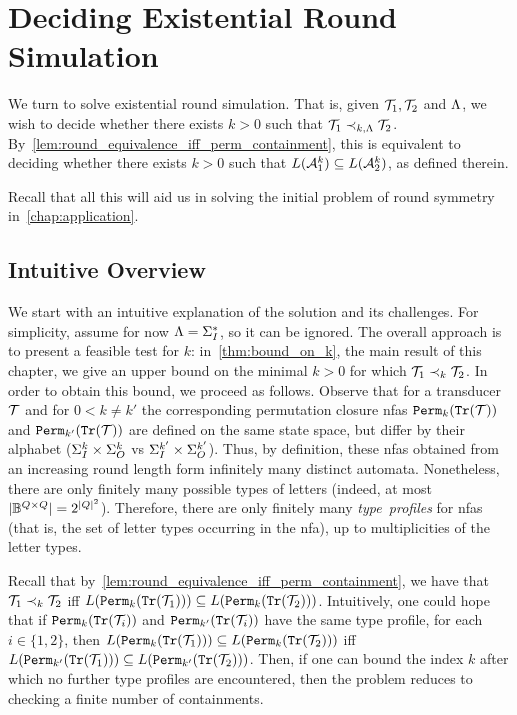 \chapter{Deciding Existential Round Simulation}
\label{chap:deciding_existential_round_sim}

We turn to solve existential round simulation. That is, given $\mathcal{T}_1,\mathcal{T}_2$ and $\Lambda$, we wish to decide whether there exists $k>0$ such that $\mathcal{T}_1\prec_{k,\Lambda} \mathcal{T}_2$. 
By~\cref{lem:round_equivalence_iff_perm_containment}, this is equivalent to deciding whether there exists $k>0$ such that $L(\mathcal{A}^k_1)\subseteq L(\mathcal{A}^k_2)$, as defined therein.

Recall that all this will aid us in solving the initial problem of round symmetry in~\cref{chap:application}.

\section{Intuitive Overview}
\label{sec:intuitive_overview}
We start with an intuitive explanation of the solution and its challenges. For simplicity, assume for now $\Lambda=\Sigma_{I}^*$, so it can be ignored. The overall approach is to present a feasible test for $k$: in~\cref{thm:bound_on_k}, the main result of this chapter, we give an upper bound on the minimal $k>0$ for which $\mathcal{T}_1\prec_{k} \mathcal{T}_2$. In order to obtain this bound, we proceed as follows. Observe that for a transducer $\mathcal{T}$ and for $0<k\neq k'$ the corresponding permutation closure \glspl{nfa} ${\mathtt{Perm}}_k({\mathtt{Tr}}(\mathcal{T}))$ and ${\mathtt{Perm}}_{k'}({\mathtt{Tr}}(\mathcal{T}))$ are defined on the same state space, but differ by their alphabet ($\Sigma_{I}^{k}\times \Sigma_{O}^{k}$ vs $\Sigma_{I}^{k'}\times \Sigma_{O}^{k'}$). Thus, by definition, these \glspl{nfa} obtained from an increasing round length form infinitely many distinct automata. Nonetheless, there are only finitely many possible types of letters (indeed, at most $|\mathbb{B}^{Q\times Q}|=2^{|Q|^2}$). Therefore, there are only finitely many \emph{type~profiles} for \glspl{nfa} (that is, the set of letter types occurring in the \gls{nfa}), up to multiplicities of the letter types.

Recall that by~\cref{lem:round_equivalence_iff_perm_containment}, we have that $\mathcal{T}_1\prec_k \mathcal{T}_2$ iff $L({\mathtt{Perm}}_k({\mathtt{Tr}}(\mathcal{T}_1)))\subseteq L({\mathtt{Perm}}_{k}({\mathtt{Tr}}(\mathcal{T}_2)))$.
Intuitively, one could hope that if ${\mathtt{Perm}}_k({\mathtt{Tr}}(\mathcal{T}_i))$ and ${\mathtt{Perm}}_{k'}({\mathtt{Tr}}(\mathcal{T}_i))$ have the same type profile, for each $i\in \{1,2\}$, then $L({\mathtt{Perm}}_k({\mathtt{Tr}}(\mathcal{T}_1)))\subseteq L({\mathtt{Perm}}_{k}({\mathtt{Tr}}(\mathcal{T}_2)))$ iff $L({\mathtt{Perm}}_{k'}({\mathtt{Tr}}(\mathcal{T}_1)))\subseteq L({\mathtt{Perm}}_{k'}({\mathtt{Tr}}(\mathcal{T}_2)))$. Then, if one can bound the index $k$ after which no further type profiles are encountered, then the problem reduces to checking a finite number of containments.

